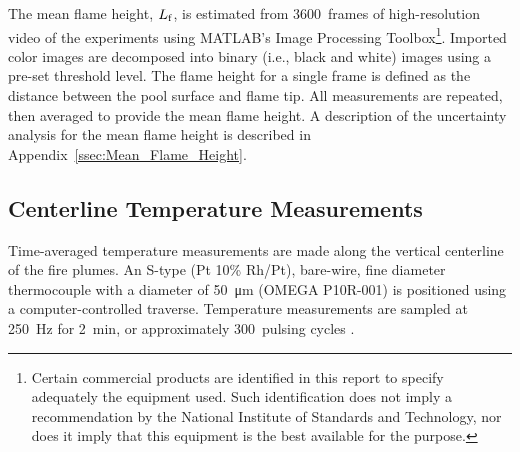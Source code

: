 \documentclass[12pt]{article}
\begin{document}
The mean flame height, $L_{\rm{f}}$, is estimated from 3600~frames of high-resolution video of the experiments using MATLAB’s Image Processing Toolbox\footnote{\label{fn:product} Certain commercial products are identified in this report to specify adequately the equipment used. Such identification does not imply a recommendation by the National Institute of Standards and Technology, nor does it imply that this equipment is the best available for the purpose.}. Imported color images are decomposed into binary (i.e., black and white) images using a pre-set threshold level. The flame height for a single frame is defined as the distance between the pool surface and flame tip. All measurements are repeated, then averaged to provide the mean flame height. A description of the uncertainty analysis for the mean flame height is described in Appendix~\ref{ssec:Mean_Flame_Height}.

\subsection{Centerline Temperature Measurements}
\label{ssec:Temperature_Measurements}

Time-averaged temperature measurements are made along the vertical centerline of the fire plumes. An S-type (Pt 10\% Rh/Pt), bare-wire, fine diameter thermocouple with a diameter of \SI{50}{\micro\metre} (OMEGA P10R-001) is positioned using a computer-controlled traverse. Temperature measurements are sampled at \SI{250}{Hz} for \SI{2}{min}, or approximately 300~pulsing cycles \cite{Wang2019}.
\end{document}
